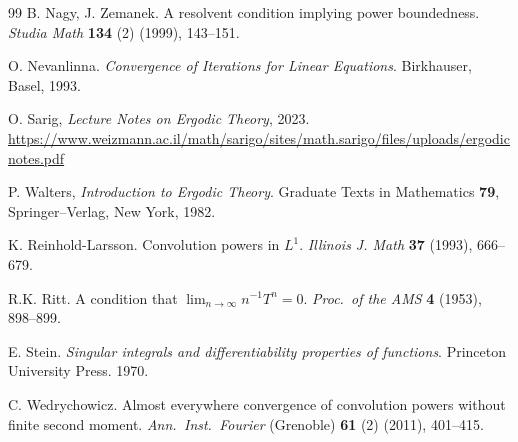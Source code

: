 \documentclass[11pt]{amsart}
\theoremstyle{definition}
\theoremstyle{remark}
\begin{document}
\begin{thebibliography}{99}
 B. Nagy, J. Zemanek. A resolvent condition implying power boundedness. \textit{Studia Math} {\bf 134} (2) (1999), 143--151.

 O. Nevanlinna. \textit{Convergence of Iterations for Linear Equations}. Birkhauser, Basel, 1993.

 O. Sarig,  \textit{Lecture Notes on Ergodic Theory}, 2023. \url{https://www.weizmann.ac.il/math/sarigo/sites/math.sarigo/files/uploads/ergodicnotes.pdf}

 P. Walters, \textit{ Introduction to Ergodic Theory}. Graduate Texts in Mathematics {\bf 79}, Springer--Verlag, New York, 1982.

 K. Reinhold-Larsson. Convolution powers in $L^1$. \textit{Illinois J. Math} {\bf 37} (1993), 666--679.

 R.K. Ritt. A condition that $\lim_{n\to\infty} n^{-1} T^n = 0$. \textit{Proc.\ of the AMS} {\bf 4} (1953), 898--899.



 E. Stein. \textit{Singular integrals and differentiability properties of functions}. Princeton University Press. 1970.

 C. Wedrychowicz. Almost everywhere convergence of convolution powers without finite second moment. \textit{Ann.\, Inst.\, Fourier} (Grenoble) {\bf 61} (2) (2011), 401--415.



\end{thebibliography}
\end{document}
